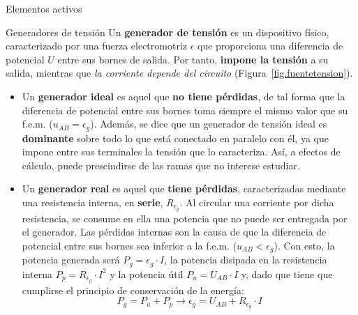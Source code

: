 \documentclass[11pt]{book} %
\makeatletter
\numberwithin{dummy}{section}
\theoremstyle{ocrenumbox}
\theoremstyle{blacknumex}
\theoremstyle{blacknumbox}
\theoremstyle{ocrenum}
\renewcommand{\subsection}{\@startsection {subsection}{2}{\z@}
{-3ex \@plus -0.1ex \@minus -.4ex}
{0.5ex \@plus.2ex }
{\normalfont\sffamily\bfseries}}
\renewcommand{\subsubsection}{\@startsection {subsubsection}{3}{\z@}
{-2ex \@plus -0.1ex \@minus -.2ex}
{.2ex \@plus.2ex }
{\normalfont\small\sffamily\bfseries}}
\makeatother
\begin{document}
	\subsection{Elementos activos}\label{sec.elementos_activos}
	
	\subsubsection{Generadores de tensión}
	Un \textbf{generador de tensión} es un dispositivo físico, caracterizado por una fuerza electromotriz $\epsilon$ que proporciona una diferencia de potencial $U$ entre sus bornes de salida. Por tanto, \textbf{impone la tensión} a su salida, mientras que \emph{la corriente depende del circuito} (Figura~\ref{fig.fuentetension}).
	\begin{itemize}
		\item Un \textbf{generador ideal} es aquel que \textbf{no tiene pérdidas}, de tal forma que la diferencia de potencial entre sus bornes toma siempre el mismo valor que su f.e.m. ($u_{AB}=\epsilon_g$). Además, se dice que un generador de tensión ideal es \textbf{dominante} sobre todo lo que está conectado en paralelo con él, ya que impone entre sus terminales la tensión que lo caracteriza. Así, a efectos de cálculo, puede prescindirse de las ramas que no interese estudiar.
		\item Un \textbf{generador real} es aquel que \textbf{tiene pérdidas}, caracterizadas mediante una resistencia interna, en \textbf{serie}, $R_{\epsilon_g}$. Al circular una corriente por dicha resistencia, se consume en ella una potencia que no puede ser entregada por el generador. Las pérdidas internas son la causa de que la diferencia de potencial entre sus bornes sea inferior a la f.e.m. ($u_{AB}<\epsilon_g$). Con esto, la potencia generada será $P_g=\epsilon_g\cdot I$, la potencia disipada en la resistencia interna $P_p=R_{\epsilon_g}\cdot I^2$ y la potencia útil $P_u=U_{AB}\cdot I$ y, dado que tiene que cumplirse el principio de conservación de la energía:
		\begin{equation}
			P_g=P_u+P_p\rightarrow \boxed{ \epsilon_g=U_{AB}+ R_{\epsilon_g}\cdot I}
		\end{equation}
	\end{itemize}
\end{document}
